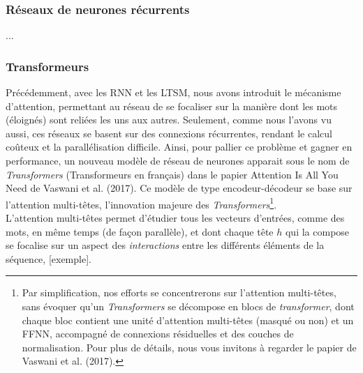 \documentclass[12pt, french]{report}
\begin{document}
\subsubsection{Réseaux de neurones récurrents}

...


\subsubsection{Transformeurs}

Précédemment, avec les RNN et les LTSM, nous avons introduit le mécanisme d'attention, permettant au réseau de se focaliser sur la manière dont les mots (éloignés) sont reliées les uns aux autres. Seulement, comme nous l'avons vu aussi, ces réseaux se basent sur des connexions récurrentes, rendant le calcul coûteux et la parallélisation difficile. Ainsi, pour pallier ce problème et gagner en performance, un nouveau modèle de réseau de neurones apparait sous le nom de \textit{Transformers} (Transformeurs en français) dans le papier \og Attention Is All You Need \fg\; de Vaswani et al. (2017). Ce modèle de type encodeur-décodeur se base sur l'attention multi-têtes, l'innovation majeure des \textit{Transformers}\footnote{Par simplification, nos efforts se concentrerons sur l'attention multi-têtes, sans évoquer qu'un \textit{Transformers} se décompose en blocs de \textit{transformer}, dont chaque bloc contient une unité d'attention multi-têtes (masqué ou non) et un FFNN, accompagné de connexions résiduelles et des couches de normalisation. Pour plus de détails, nous vous invitons à regarder le papier de Vaswani et al. (2017).}.\\

L'attention multi-têtes permet d'étudier tous les vecteurs d'entrées, comme des mots, en même temps (de façon parallèle), et dont chaque tête $h$ qui la compose se focalise sur un aspect des \textit{interactions} entre les différents éléments de la séquence, [exemple].\\ 
\end{document}
